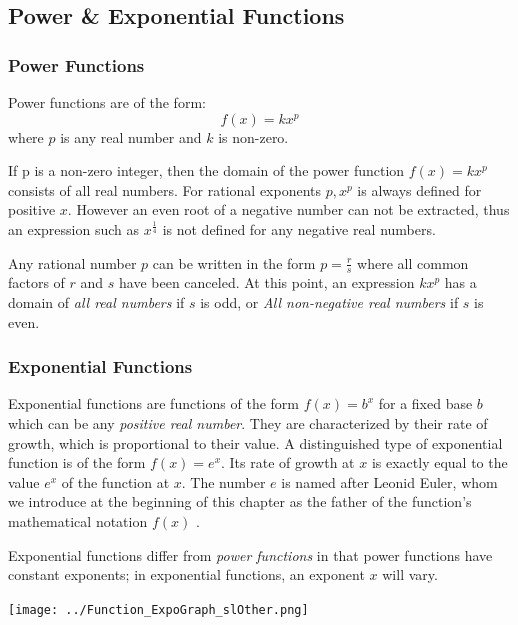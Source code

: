 \documentclass[11pt,oneside]{book}              %
\begin{document}
\subsection{Power \& Exponential Functions}
\subsubsection{Power Functions}

Power functions are of the form:
\begin{equation*}
  f(x) = kx^p
\end{equation*}
where $p$ is any real number and $k$ is non-zero.

If p is a non-zero integer, then the domain of the power function $f(x) = kx^p$ consists of all real numbers. For rational exponents $p, x^p$ is always defined for positive $x$. However an even root of a negative number can not be extracted, thus an expression such as $x^{\frac{1}{4}}$ is not defined for any negative real numbers.

Any rational number $p$ can be written in the form $p = \frac{r}{s}$ where all common factors of $r$ and $s$ have been canceled. At this point, an expression $kx^p$ has a domain of \textit{all real numbers} if $s$ is odd, or \textit{All non-negative real numbers} if $s$ is even.

\subsubsection{Exponential Functions}
Exponential functions are functions of the form $f(x) = b^x$ for a fixed base $b$ which can be any \textit{positive real number}. They are characterized by their rate of growth, which is proportional to their value. A distinguished type of exponential function is of the form $f(x) = e^x$. Its rate of growth at $x$ is exactly equal to the value $e^x$ of the function at $x$. The number $e$ is named after Leonid Euler, whom we introduce at the beginning of this chapter as the father of the function's mathematical notation $f(x)$ \cite{oregonstateexp}.

Exponential functions differ from \textit{power functions} in that power functions have constant exponents; in exponential functions, an exponent $x$ will vary.
\begin{center}\texttt{[image: ../Function\_ExpoGraph\_slOther.png]} \end{center}
\end{document}
